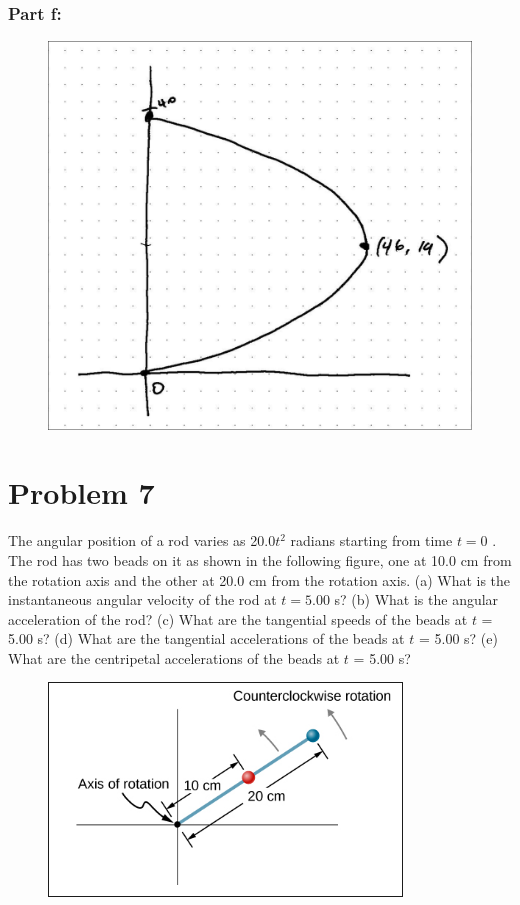 \documentclass{article}
\begin{document}
\subsubsection*{Part f:}
\begin{figure}[!ht]
    \centering
    \includegraphics[scale=0.2]{graph-1.png}
\end{figure}

\section*{Problem 7}
The angular position of a rod varies as 20.0$t^2$ radians starting from time $t = 0$ . The rod has
two beads on it as shown in the following figure, one at 10.0 cm from the rotation axis and the
other at 20.0 cm from the rotation axis. (a) What is the instantaneous angular velocity of the rod
at $t = 5.00$ s? (b) What is the angular acceleration of the rod? (c) What are the tangential speeds
of the beads at $t$ = 5.00 s? (d) What are the tangential accelerations of the beads at $t$ = 5.00 s? (e)
What are the centripetal accelerations of the beads at $t$ = 5.00 s?

\begin{figure}[ht]
    \centering
    \includegraphics[scale=0.5]{drawing-2.png}
\end{figure}
\end{document}

